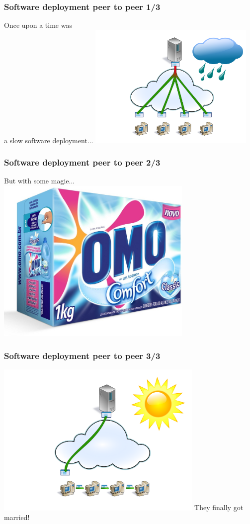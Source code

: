 \documentclass{beamer}
\begin{document}
\begin{frame}
\frametitle{Software deployment peer to peer 1/3}
    Once upon a time was \\
    a slow software deployment...
    \includegraphics[height=6cm]{pics/p2p-sans.pdf}
\end{frame}
\begin{frame}
\frametitle{Software deployment peer to peer 2/3}
But with some magie...
   \includegraphics[height=8cm]{./pics/OMO.jpg}
\end{frame}
\begin{frame}
\frametitle{Software deployment peer to peer 3/3}
    \includegraphics[height=7.5cm]{pics/p2p-avec.pdf}
    They finally got married!
\end{frame}
\end{document}
